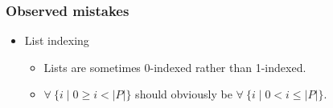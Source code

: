 \begin{frame}

\frametitle{Observed mistakes}

\begin{itemize}

\item List indexing

\begin{itemize}

\item Lists are sometimes 0-indexed rather than 1-indexed.

\item $\forall\ \{i\mid 0\geq i < |P|\}$ should obviously be $\forall\ \{i\mid
0< i \leq |P|\}$.

\end{itemize}

\end{itemize}

\end{frame}
